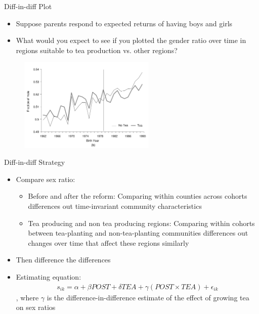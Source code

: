\documentclass[11pt,notes=hide,aspectratio=169,mathserif]{beamer}
\begin{document}
\begin{frame}{Diff-in-diff Plot}
\begin{itemize}
\item Suppose parents respond to expected returns of having boys and girls
\item What would you expect to see if you plotted the gender ratio over time in regions suitable to tea production vs. other regions?
\end{itemize}
\pause 
\begin{figure}
\centering
\includegraphics[width=0.58\textwidth]{inputs/fig3b.png}
\end{figure}
\end{frame}

\begin{frame}{Diff-in-diff Strategy}
\begin{itemize}
\item Compare sex ratio:
\begin{itemize}
    \item Before and after the reform:  Comparing within counties across cohorts differences out time-invariant community characteristics
    \item Tea producing and non tea producing  regions: Comparing within cohorts between tea-planting and non-tea-planting communities differences out changes over time that affect these regions similarly
\end{itemize}
\item Then difference the differences 
\item Estimating equation:
\begin{align*}
s_{ik} = \alpha + \beta POST + \delta TEA + \gamma (POST \times TEA) + \epsilon_{ik}
\end{align*}
, where $\gamma$ is the difference-in-difference estimate of the effect of growing tea on sex ratios
\end{itemize}
\end{frame}
\end{document}
